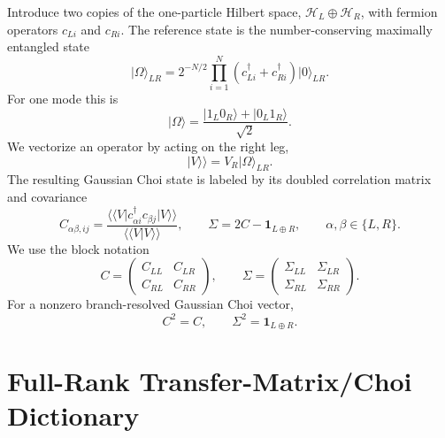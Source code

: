\documentclass[aps,prb,onecolumn,nofootinbib,superscriptaddress]{revtex4-2}
\newcommand{\I}{\mathbf{1}}
\newcommand{\ket}[1]{\lvert #1\rangle}
\newcommand{\bra}[1]{\langle #1\rvert}
\newcommand{\cH}{\mathcal{H}}
\theoremstyle{plain}
\theoremstyle{definition}
\begin{document}
Introduce two copies of the one-particle Hilbert space,
\(\cH_L\oplus\cH_R\), with fermion operators \(c_{Li}\) and \(c_{Ri}\).  The
reference state is the number-conserving maximally entangled state
\begin{equation}
  \ket{\Omega}_{LR}
  =
  2^{-N/2}\prod_{i=1}^{N}
  \left(c_{Li}^\dagger+c_{Ri}^\dagger\right)\ket{0}_{LR}.
  \label{eq:reference-state}
\end{equation}
For one mode this is
\begin{equation}
  \ket{\Omega}
  =
  \frac{\ket{1_L0_R}+\ket{0_L1_R}}{\sqrt2}.
  \label{eq:one-mode-reference}
\end{equation}
We vectorize an operator by acting on the right leg,
\begin{equation}
  \ket{V}\!\rangle
  =
  V_R\ket{\Omega}_{LR}.
  \label{eq:choi-vector}
\end{equation}
The resulting Gaussian Choi state is labeled by its doubled correlation matrix
and covariance
\begin{equation}
  C_{\alpha\beta,ij}
  =
  \frac{\langle\!\bra{V}c_{\alpha i}^\dagger c_{\beta j}\ket{V}\!\rangle}
       {\langle\!\bra{V}V\rangle\!\rangle},
  \qquad
  \Sigma=2C-\I_{L\oplus R},
  \qquad
  \alpha,\beta\in\{L,R\}.
  \label{eq:choi-C-Sigma}
\end{equation}
We use the block notation
\begin{equation}
  C=
  \begin{pmatrix}
    C_{LL} & C_{LR}\\
    C_{RL} & C_{RR}
  \end{pmatrix},
  \qquad
  \Sigma=
  \begin{pmatrix}
    \Sigma_{LL} & \Sigma_{LR}\\
    \Sigma_{RL} & \Sigma_{RR}
  \end{pmatrix}.
  \label{eq:block-notation}
\end{equation}
For a nonzero branch-resolved Gaussian Choi vector,
\begin{equation}
  C^2=C,
  \qquad
  \Sigma^2=\I_{L\oplus R}.
  \label{eq:choi-purity}
\end{equation}

\section{Full-Rank Transfer-Matrix/Choi Dictionary}
\end{document}
